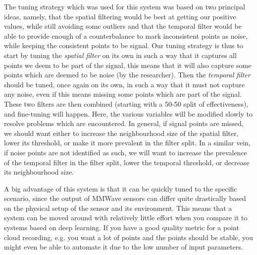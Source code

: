 The tuning strategy which was used for this system was based on two principal ideas, namely, that the spatial filtering would be best at getting our positive values, while still avoiding some outliers and that the temporal filter would be able to provide enough of a counterbalance to mark inconsistent points as noise, while keeping the consistent points to be signal.
Our tuning strategy is thus to start by tuning the \textit{spatial filter} on its own in such a way that it captures all points we deem to be part of the signal, this means that it will also capture some points which are deemed to be noise (by the researcher).
Then the \textit{temporal filter} should be tuned, once again on its own, in such a way that it must not capture any noise, even if this means missing some points which are part of the signal.
These two filters are then combined (starting with a 50-50 split of effectiveness), and fine-tuning will happen. 
Here, the various variables will be modified slowly to resolve problems which are encountered.
In general, if signal points are missed, we should want either to increase the neighbourhood size of the spatial filter, lower its threshold, or make it more prevalent in the filter split.
In a similar vein, if noise points are not identified as such, we will want to increase the prevalence of the temporal filter in the filter split, lower the temporal threshold, or decrease its neighbourhood size.

A big advantage of this system is that it can be quickly tuned to the specific scenario, since the output of MMWave sensors can differ quite drastically based on the physical setup of the sensor and its environment.
This means that a system can be moved around with relatively little effort when you compare it to systems based on deep learning.
If you have a good quality metric for a point cloud recording, e.g. you want a lot of points and the points should be stable, you might even be able to automate it due to the low number of input parameters.



